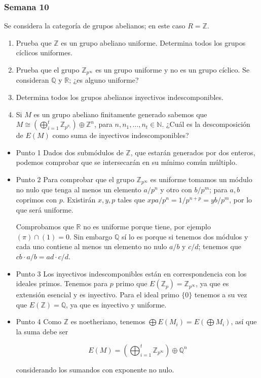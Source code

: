 \documentclass[11pt]{article}
\begin{document}
\subsubsection*{Semana 10}
\label{sec-7-4-9}
\begin{statement}
Se considera la categoría de grupos abelianos; en este caso $R = \mathbb{Z}$.

\begin{enumerate}
\item Prueba que $\mathbb{Z}$ es un grupo abeliano uniforme. Determina todos los grupos
cíclicos uniformes.
\item Prueba que el grupo $\mathbb{Z}_{p^{\infty}}$ es un grupo uniforme y no es un grupo cíclico.
Se consideran $\mathbb{Q}$ y $\mathbb{R}$; ¿es alguno uniforme?
\item Determina todos los grupos abelianos inyectivos indescomponibles.
\item Si $M$ es un grupo abeliano finitamente generado sabemos que 
$M \cong \left( \bigoplus^t_{i=1} \mathbb{Z}_{p^{n_i}} \right) \oplus \mathbb{Z}^n$, para $n,n_1,\dots,n_t \in \mathbb{N}$. ¿Cuál es la descomposición
de $E(M)$ como suma de inyectivos indescomponibles?
\end{enumerate}
\end{statement}

\begin{itemize}
\item Punto 1
\label{sec-7-4-9-1}
Dados dos submódulos de $\mathbb{Z}$, que estarán generados por dos enteros, podemos
comprobar que se intersecarán en su mínimo común múltiplo.

\item Punto 2
\label{sec-7-4-9-2}
Para comprobar que el grupo $\mathbb{Z}_{p^{\infty}}$ es uniforme tomamos un módulo no 
nulo que tenga al menos un elemento $a/p^n$ y otro con $b/p^m$; 
para $a,b$ coprimos con $p$.  Existirán $x,y,p$ tales que
$xp a/p^n = 1/p^{n+p} = y b/p^{m}$, por lo que será uniforme.

Comprobamos que $\mathbb{R}$ no es uniforme porque tiene, por ejemplo $(\pi) \cap (1) = 0$.
Sin embargo $\mathbb{Q}$ sí lo es porque si tenemos dos módulos y cada uno contiene
al menos un elemento no nulo $a/b$ y $c/d$; tenemos que $cb \cdot a/b = ad \cdot c/d$.

\item Punto 3
\label{sec-7-4-9-3}
Los inyectivos indescomponibles están en correspondencia con los ideales
primos. Tenemos para $p$ primo que $E(\mathbb{Z}_p) = \mathbb{Z}_{p^{\infty}}$, ya que es extensión esencial
y es inyectivo. Para el ideal primo $\{0\}$ tenemos a su vez que $E(\mathbb{Z}) = \mathbb{Q}$, ya
que es inyectivo y uniforme.

\item Punto 4
\label{sec-7-4-9-4}
Como $\mathbb{Z}$ es noetheriano, tenemos $\bigoplus E(M_i) = E \left( \bigoplus M_i \right)$, así que la suma
debe ser

\[
E(M) = \left( \bigoplus_{i=1}^t \mathbb{Z}_{p^{\infty}} \right) \oplus \mathbb{Q}^n
\]

considerando los sumandos con exponente no nulo.
\end{itemize}
\end{document}
